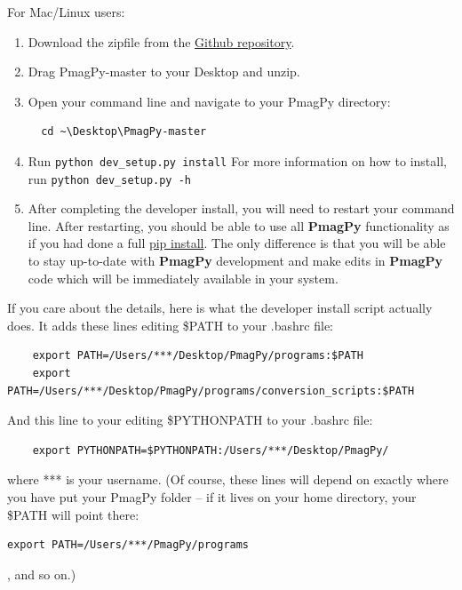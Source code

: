 \documentclass[11pt]{book}
\begin{document}
{\begin{enumerate}
\end{enumerate}

For Mac/Linux users:

\begin{enumerate}

\item  Download the zipfile from the \href{https://github.com/PmagPy/PmagPy}{Github repository}.

\item Drag PmagPy-master to your Desktop and unzip.

\item Open your command line and navigate to your PmagPy directory: \begin{verbatim}
  cd ~\Desktop\PmagPy-master
\end{verbatim}

\item Run \verb!python dev_setup.py install!  For more information on how to install, run \verb!python dev_setup.py -h!

\item After completing the developer install, you will need to restart your command line.  After restarting, you should be able to use all {\bf PmagPy} functionality as if you had done a full \href{#pip_install}{pip install}.  The only difference is that you will be able to stay up-to-date with {\bf PmagPy} development and make edits in {\bf PmagPy} code which will be immediately available in your system.

\end{enumerate}


If you care about the details, here is what the developer install script actually does.  It adds these lines editing \$PATH to your .bashrc file:

\begin{verbatim}
    export PATH=/Users/***/Desktop/PmagPy/programs:$PATH
    export PATH=/Users/***/Desktop/PmagPy/programs/conversion_scripts:$PATH
\end{verbatim}

And this line to your editing \$PYTHONPATH to your .bashrc file:
\begin{verbatim}
    export PYTHONPATH=$PYTHONPATH:/Users/***/Desktop/PmagPy/
\end{verbatim}


where *** is your username.  (Of course, these lines will depend on exactly where you have put your PmagPy folder -- if it lives on your home directory, your \$PATH will point there: \begin{verbatim}export PATH=/Users/***/PmagPy/programs\end{verbatim}, and so on.)




}
\end{document}
